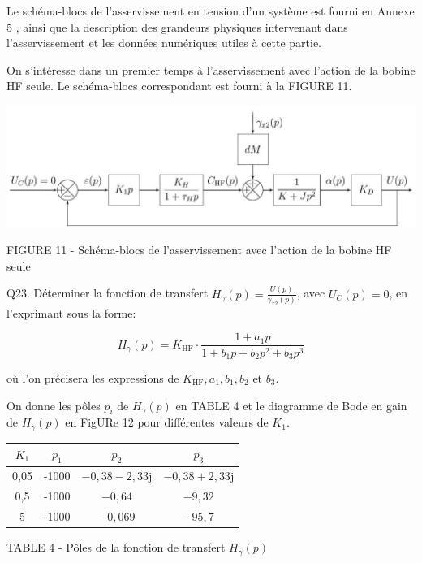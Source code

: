 \documentclass[10pt]{article}
\begin{document}
Le schéma-blocs de l'asservissement en tension d'un système est fourni en Annexe 5 , ainsi que la description des grandeurs physiques intervenant dans l'asservissement et les données numériques utiles à cette partie.

On s'intéresse dans un premier temps à l'asservissement avec l'action de la bobine HF seule. Le schéma-blocs correspondant est fourni à la FIGURE 11.

\begin{center}
\includegraphics[max width=\textwidth]{2024_04_26_3285cfc264024262add0g-13(1)}
\end{center}

FIGURE 11 - Schéma-blocs de l'asservissement avec l'action de la bobine HF seule

Q23. Déterminer la fonction de transfert $H_{\gamma}(p)=\frac{U(p)}{\gamma_{x 2}(p)}$, avec $U_{C}(p)=0$, en l'exprimant sous la forme:

$$
H_{\gamma}(p)=K_{\mathrm{HF}} \cdot \frac{1+a_{1} p}{1+b_{1} p+b_{2} p^{2}+b_{3} p^{3}}
$$

où l'on précisera les expressions de $K_{\mathrm{HF}}, a_{1}, b_{1}, b_{2}$ et $b_{3}$.

On donne les pôles $p_{i}$ de $H_{\gamma}(p)$ en TABLE 4 et le diagramme de Bode en gain de $H_{\gamma}(p)$ en FigURe 12 pour différentes valeurs de $K_{1}$.

\begin{center}
\begin{tabular}{|c|c|c|c|}
\hline
$K_{1}$ & $p_{1}$ & $p_{2}$ & $p_{3}$ \\
\hline\hline
0,05 & -1000 & $-0,38-2,33 \mathrm{j}$ & $-0,38+2,33 \mathrm{j}$ \\
\hline
0,5 & -1000 & $-0,64$ & $-9,32$ \\
\hline
5 & -1000 & $-0,069$ & $-95,7$ \\
\hline
\end{tabular}
\end{center}

TABLE 4 - Pôles de la fonction de transfert $H_{\gamma}(p)$
\end{document}
